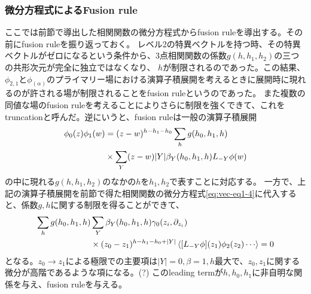 \documentclass[11pt, aps, longbibliography]{article}
\numberwithin{equation}{section}
\begin{document}
        \subsubsection{微分方程式によるFusion rule}
        ここでは前節で導出した相関関数の微分方程式からfusion ruleを導出する。その前にfusion ruleを振り返っておく。
        レベル2の特異ベクトルを持つ時、その特異ベクトルがゼロになるという条件から、3点相関関数の係数$g(h,h_1,h_2)$の三つの共形次元が完全に独立ではなくなり、
        $h$が制限されるのであった。この結果、$\phi_{2,1}$と$\phi_{(\alpha)}$のプライマリー場における演算子積展開を考えるときに展開時に現れるのが許される場が制限されることをfusion ruleというのであった。
        また複数の同値な場のfusion ruleを考えることによりさらに制限を強くできて、これをtruncationと呼んだ。逆にいうと、fusion ruleは一般の演算子積展開
        \begin{align}\label{eq:fusion1-1}
            \phi_0(z)\phi_1(w) &= (z-w)^{h-h_1-h_0}\sum_{h}g(h_0,h_1,h) \notag \\
            &\times \sum_Y (z-w)|Y| \beta_Y(h_0,h_1,h)L_{-Y}\phi(w)
        \end{align}
        の中に現れる$g(h,h_1,h_2)$のなかの$h$を$h_1,h_2$で表すことに対応する。
        一方で、上記の演算子積展開を前節で得た相関関数の微分方程式\eqref{eq:vec-eq1-4}に代入すると、係数$g,h$に関する制限を得ることができて、
        \begin{align}\label{eq:fusion1-2}
            \sum_h g(h_0,h_1,h) &\sum_Y \beta_Y(h_0,h_1,h)\gamma_0(z_i,\partial_{z_i}) \notag \\
            &\times (z_0-z_1)^{h-h_1-h_0+|Y|}\expval{[L_{-Y}\phi](z_1)\phi_2(z_2)\cdots} = 0
        \end{align}
        となる。$z_0 \rightarrow z_1$による極限での主要項は$|Y|=0, \beta=1, h$最大で、$z_0,z_1$に関する微分が高階であるような項になる。(?)
        このleading termが$h,h_0,h_1$に非自明な関係を与え、fusion ruleを与える。
\end{document}
